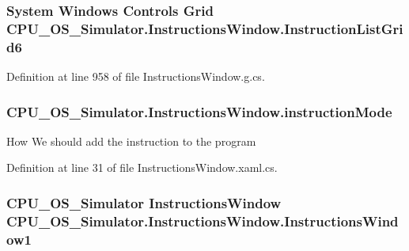 \subsubsection[{Instruction\+List\+Grid6}]{\setlength{\rightskip}{0pt plus 5cm}System Windows Controls Grid C\+P\+U\+\_\+\+O\+S\+\_\+\+Simulator.\+Instructions\+Window.\+Instruction\+List\+Grid6\hspace{0.3cm}{\ttfamily [package]}}\label{class_c_p_u___o_s___simulator_1_1_instructions_window_a6c86a044f242ee64f312f0105bac6d36}


Definition at line 958 of file Instructions\+Window.\+g.\+cs.

\hypertarget{class_c_p_u___o_s___simulator_1_1_instructions_window_aae7addf8e362e26e981b36b9940a53c0}{}
\subsubsection[{instruction\+Mode}]{ C\+P\+U\+\_\+\+O\+S\+\_\+\+Simulator.\+Instructions\+Window.\+instruction\+Mode\hspace{0.3cm}{\ttfamily [private]}}\label{class_c_p_u___o_s___simulator_1_1_instructions_window_aae7addf8e362e26e981b36b9940a53c0}


How We should add the instruction to the program 



Definition at line 31 of file Instructions\+Window.\+xaml.\+cs.

\hypertarget{class_c_p_u___o_s___simulator_1_1_instructions_window_ab7cd84f5ba064256327f6b1b1cdbc525}{}
\subsubsection[{Instructions\+Window1}]{\setlength{\rightskip}{0pt plus 5cm}C\+P\+U\+\_\+\+O\+S\+\_\+\+Simulator {\bf Instructions\+Window} C\+P\+U\+\_\+\+O\+S\+\_\+\+Simulator.\+Instructions\+Window.\+Instructions\+Window1\hspace{0.3cm}{\ttfamily [package]}}\label{class_c_p_u___o_s___simulator_1_1_instructions_window_ab7cd84f5ba064256327f6b1b1cdbc525}


